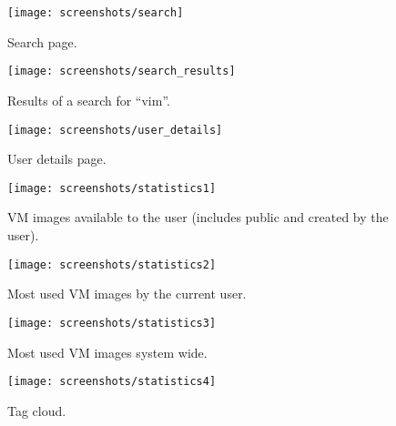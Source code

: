 \begin{figure}[h]
  \begin{center}
    \leavevmode
    \texttt{[image: screenshots/search]}
    \caption{Search page.}
    \label{fig:search-page}
  \end{center}
\end{figure}

\begin{figure}[h]
  \begin{center}
    \leavevmode
    \texttt{[image: screenshots/search\_results]}
    \caption{Results of a search for ``vim''.}
    \label{fig:search-results}
  \end{center}
\end{figure}

\begin{figure}[h]
  \begin{center}
    \leavevmode
    \texttt{[image: screenshots/user\_details]}
    \caption{User details page.}
    \label{fig:1}
  \end{center}
\end{figure}

\begin{figure}[h]
  \begin{center}
    \leavevmode
    \texttt{[image: screenshots/statistics1]}
    \caption{VM images available to the user (includes public and created by the user).}
    \label{fig:user-vms}
  \end{center}
\end{figure}

\begin{figure}[h]
  \begin{center}
    \leavevmode
    \texttt{[image: screenshots/statistics2]}
    \caption{Most used VM images by the current user.}
    \label{fig:user-mostused-vms}
  \end{center}
\end{figure}

\begin{figure}[h]
  \begin{center}
    \leavevmode
    \texttt{[image: screenshots/statistics3]}
    \caption{Most used VM images system wide.}
    \label{fig:system-mostused-vms}
  \end{center}
\end{figure}

\begin{figure}[h]
  \begin{center}
    \leavevmode
    \texttt{[image: screenshots/statistics4]}
    \caption{Tag cloud.}
    \label{fig:tagcloud}
  \end{center}
\end{figure}

